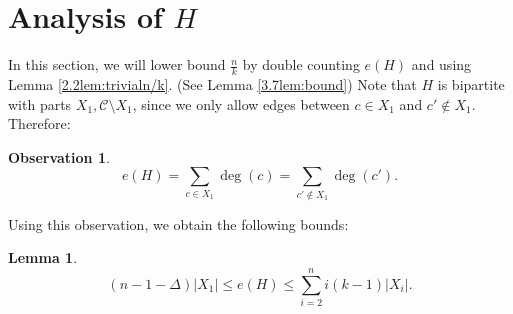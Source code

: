 \documentclass{amsart}
\newcommand{\1}{\mathds{1}}
\newtheorem{lemma}[theorem]{Lemma}
\newtheorem{obs}[theorem]{Observation}
\numberwithin{theorem}{section}
\def\cC{\ensuremath{\mathcal{C}}}
\begin{document}
\section{Analysis of $H$}
In this section, we will lower bound $\frac{n}{k}$ by double counting $e(H)$ and using Lemma \ref{2.2lem:trivialn/k}. (See Lemma \ref{3.7lem:bound}) Note that $H$ is bipartite with parts $X_1, \cC \setminus X_1$, since we only allow edges between $c\in X_1$ and $c'\notin X_1$. Therefore:
\begin{obs}\label{3.1obs:degs} $$e(H)=\sum_{c\in X_1} \deg(c)=\sum_{c' \notin X_1} \deg(c').$$\end{obs}
Using this observation, we obtain the following bounds: 
\begin{lemma}\label{3.2lem} %
     $$(n-1-\Delta)|X_1| \leq e(H) \leq \sum_{i=2}^n i(k-1)|X_i|.$$
\end{lemma}
\end{document}
